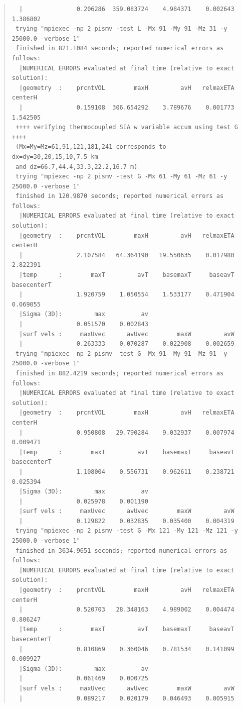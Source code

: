 \documentclass[11pt,final]{amsart}
\begin{document}
\begin{quote}
\begin{verbatim}
  |               0.206286  359.083724    4.984371    0.002643     1.386802
 trying "mpiexec -np 2 pismv -test L -Mx 91 -My 91 -Mz 31 -y 25000.0 -verbose 1"
 finished in 821.1084 seconds; reported numerical errors as follows:
  |NUMERICAL ERRORS evaluated at final time (relative to exact solution):
  |geometry  :    prcntVOL        maxH         avH   relmaxETA      centerH
  |               0.159108  306.654292    3.789676    0.001773     1.542505
 ++++ verifying thermocoupled SIA w variable accum using test G ++++
 (Mx=My=Mz=61,91,121,181,241 corresponds to dx=dy=30,20,15,10,7.5 km
 and dz=66.7,44.4,33.3,22.2,16.7 m)
 trying "mpiexec -np 2 pismv -test G -Mx 61 -My 61 -Mz 61 -y 25000.0 -verbose 1"
 finished in 120.9870 seconds; reported numerical errors as follows:
  |NUMERICAL ERRORS evaluated at final time (relative to exact solution):
  |geometry  :    prcntVOL        maxH         avH   relmaxETA      centerH
  |               2.107584   64.364190   19.550635    0.017980     2.822391
  |temp      :        maxT         avT    basemaxT     baseavT  basecenterT
  |               1.920759    1.050554    1.533177    0.471904     0.069055
  |Sigma (3D):         max          av
  |               0.051570    0.002843
  |surf vels :     maxUvec      avUvec        maxW         avW
  |               0.263333    0.070287    0.022908    0.002659
 trying "mpiexec -np 2 pismv -test G -Mx 91 -My 91 -Mz 91 -y 25000.0 -verbose 1"
 finished in 882.4219 seconds; reported numerical errors as follows:
  |NUMERICAL ERRORS evaluated at final time (relative to exact solution):
  |geometry  :    prcntVOL        maxH         avH   relmaxETA      centerH
  |               0.950808   29.790284    9.032937    0.007974     0.009471
  |temp      :        maxT         avT    basemaxT     baseavT  basecenterT
  |               1.108004    0.556731    0.962611    0.238721     0.025394
  |Sigma (3D):         max          av
  |               0.025978    0.001190
  |surf vels :     maxUvec      avUvec        maxW         avW
  |               0.129822    0.032835    0.035400    0.004319
 trying "mpiexec -np 2 pismv -test G -Mx 121 -My 121 -Mz 121 -y 25000.0 -verbose 1"
 finished in 3634.9651 seconds; reported numerical errors as follows:
  |NUMERICAL ERRORS evaluated at final time (relative to exact solution):
  |geometry  :    prcntVOL        maxH         avH   relmaxETA      centerH
  |               0.520703   28.348163    4.989002    0.004474     0.806247
  |temp      :        maxT         avT    basemaxT     baseavT  basecenterT
  |               0.810869    0.360046    0.781534    0.141099     0.009927
  |Sigma (3D):         max          av
  |               0.061469    0.000725
  |surf vels :     maxUvec      avUvec        maxW         avW
  |               0.089217    0.020179    0.046493    0.005915
\end{verbatim}
\end{quote}\normalsize
\end{document}
